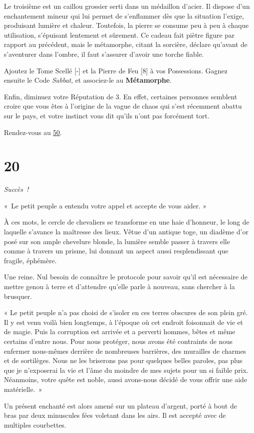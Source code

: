\documentclass{report}
\newcommand{\gsection}[1]{
    \section{#1}
    \label{section-#1}
}
\newcommand{\glink}[1]{\hyperref[section-#1]{#1}}
\newcommand{\success}{\emph{Succès !}}
\newcommand{\hero}[1]{\textbf{#1}}
\begin{document}
Le troisième est un caillou grossier serti dans un médaillon d'acier. Il dispose d'un enchantement mineur qui lui permet de s'enflammer dès que la situation l'exige, produisant lumière et chaleur. Toutefois, la pierre se consume peu à peu à chaque utilisation, s'épuisant lentement et sûrement. Ce cadeau fait piètre figure par rapport au précédent, mais le métamorphe, citant la sorcière, déclare qu'avant de s'aventurer dans l'ombre, il faut s'assurer d'avoir une torche fiable.

Ajoutez le Tome Scellé [-] et la Pierre de Feu [8] à vos Possessions. Gagnez ensuite le Code \emph{Sabbat}, et associez-le au \hero{Métamorphe}.

Enfin, diminuez votre Réputation de 3. En effet, certaines personnes semblent croire que vous êtes à l'origine de la vague de chaos qui s'est récemment abattu sur le pays, et votre instinct vous dit qu'ils n'ont pas forcément tort.

Rendez-vous au \glink{50}.

\gsection{20}

\success

« Le petit peuple a entendu votre appel et accepte de vous aider. »

À ces mots, le cercle de chevaliers se transforme en une haie d'honneur, le long de laquelle s'avance la maîtresse des lieux. Vêtue d'un antique toge, un diadème d'or posé sur son ample chevelure blonde, la lumière semble passer à travers elle comme à travers un prisme, lui donnant un aspect aussi resplendissant que fragile, éphémère.

Une reine. Nul besoin de connaître le protocole pour savoir qu'il est nécessaire de mettre genou à terre et d'attendre qu'elle parle à nouveau, sans chercher à la brusquer.

« Le petit peuple n'a pas choisi de s'isoler en ces terres obscures de son plein gré. Il y est venu voilà bien longtemps, à l'époque où cet endroit foisonnait de vie et de magie. Puis la corruption est arrivée et a perverti hommes, bêtes et même certains d'entre nous. Pour nous protéger, nous avons été contraints de nous enfermer nous-mêmes derrière de nombreuses barrières, des murailles de charmes et de sortilèges. Nous ne les briserons pas pour quelques belles paroles, pas plus que je n'exposerai la vie et l'âme du moindre de mes sujets pour un si faible prix. Néanmoins, votre quête est noble, aussi avons-nous décidé de vous offrir une aide matérielle. »

Un présent enchanté est alors amené sur un plateau d'argent, porté à bout de bras par deux minuscules fées voletant dans les airs. Il est accepté avec de multiples courbettes.
\end{document}
